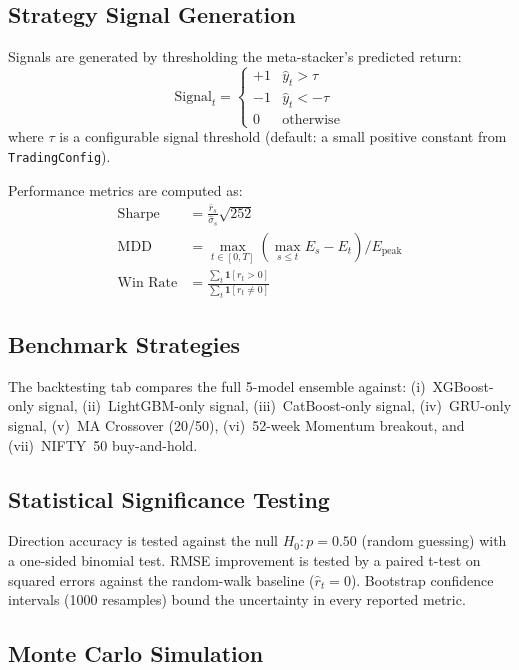 \documentclass[10pt,a4paper,twoside]{article}
\begin{document}
\subsection{Strategy Signal Generation}

Signals are generated by thresholding the meta-stacker's predicted return:
\begin{equation}
  \text{Signal}_t = \begin{cases}
    +1 & \hat{y}_t > \tau \\
    -1 & \hat{y}_t < -\tau \\
     0 & \text{otherwise}
  \end{cases}
\end{equation}
where $\tau$ is a configurable signal threshold (default: a small positive
constant from \texttt{TradingConfig}).

Performance metrics are computed as:
\begin{align}
  \text{Sharpe} &= \frac{\bar{r}_s}{\hat{\sigma}_s}\sqrt{252} \\
  \text{MDD} &= \max_{t \in [0,T]}\left(\max_{s \leq t} E_s - E_t\right) / E_{\text{peak}} \\
  \text{Win Rate} &= \frac{\sum_t \mathbf{1}[r_t > 0]}{\sum_t \mathbf{1}[r_t \neq 0]}
\end{align}

\subsection{Benchmark Strategies}

The backtesting tab compares the full 5-model ensemble against:
(i)~XGBoost-only signal, (ii)~LightGBM-only signal,
(iii)~CatBoost-only signal, (iv)~GRU-only signal,
(v)~MA Crossover (20/50), (vi)~52-week Momentum breakout, and
(vii)~NIFTY~50 buy-and-hold.

\subsection{Statistical Significance Testing}

Direction accuracy is tested against the null $H_0: p = 0.50$ (random
guessing) with a one-sided binomial test. RMSE improvement is tested by a
paired t-test on squared errors against the random-walk baseline
($\hat{r}_t = 0$). Bootstrap confidence intervals (1000 resamples) bound the
uncertainty in every reported metric.

\subsection{Monte Carlo Simulation}
\end{document}
